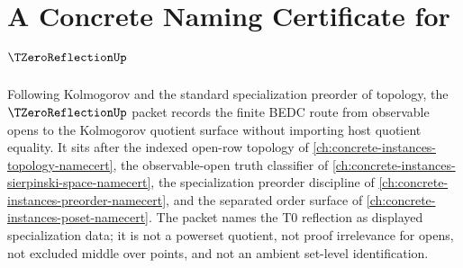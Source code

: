 \chapter{A Concrete Naming Certificate for $\TZeroReflectionUp$}
\label{ch:concrete-instances-tzero-reflection-namecert}

Following Kolmogorov and the standard specialization preorder of topology, the $\TZeroReflectionUp$ packet records the finite BEDC route from observable opens to the Kolmogorov quotient surface without importing host quotient equality. It sits after the indexed open-row topology of \autoref{ch:concrete-instances-topology-namecert}, the observable-open truth classifier of \autoref{ch:concrete-instances-sierpinski-space-namecert}, the specialization preorder discipline of \autoref{ch:concrete-instances-preorder-namecert}, and the separated order surface of \autoref{ch:concrete-instances-poset-namecert}. The packet names the T0 reflection as displayed specialization data; it is not a powerset quotient, not proof irrelevance for opens, not excluded middle over points, and not an ambient set-level identification.

